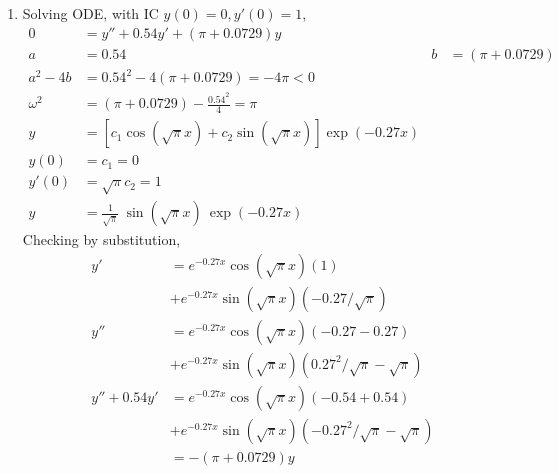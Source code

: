 \begin{enumerate}
    \item Solving ODE, with IC $ y(0) = 0, y'(0) = 1 $,
          \begin{align}
              0          & = y'' + 0.54y' + (\pi + 0.0729)y                            \\
              a          & = 0.54                                                    &
              b          & = (\pi + 0.0729)                                            \\
              a^{2} - 4b & = 0.54^{2} - 4(\pi + 0.0729) = -4\pi < 0                    \\
              \omega^{2} & = (\pi + 0.0729) - \frac{0.54^{2}}{4} = \pi                 \\
              y          & = [c_{1}\cos(\sqrt{\pi} x) + c_{2}\sin(\sqrt{\pi} x)]
              \exp(-0.27x)                                                             \\
              y(0)       & = c_{1} = 0                                                 \\
              y'(0)      & = \sqrt{\pi}c_{2} = 1                                       \\
              y          & = \frac{1}{\sqrt{\pi}}\ \sin(\sqrt{\pi} x)\  \exp(-0.27x)
          \end{align}
          Checking by substitution,
          \begin{align}
              y'           & = e^{-0.27x}\cos(\sqrt{\pi} x) (1) \\
                           & + e^{-0.27x}\sin(\sqrt{\pi} x)
              (- 0.27/\sqrt{\pi})                               \\
              y''          & = e^{-0.27x}\cos(\sqrt{\pi} x)
              (-0.27 - 0.27)                                    \\
                           & + e^{-0.27x}\sin(\sqrt{\pi} x)
              (0.27^{2}/\sqrt{\pi} - \sqrt{\pi})                \\
              y'' + 0.54y' & = e^{-0.27x}\cos(\sqrt{\pi} x)
              (-0.54 + 0.54)                                    \\
                           & + e^{-0.27x}\sin(\sqrt{\pi} x)
              (-0.27^{2}/\sqrt{\pi} - \sqrt{\pi})               \\
                           & = -(\pi + 0.0729) y
          \end{align}


\end{enumerate}
